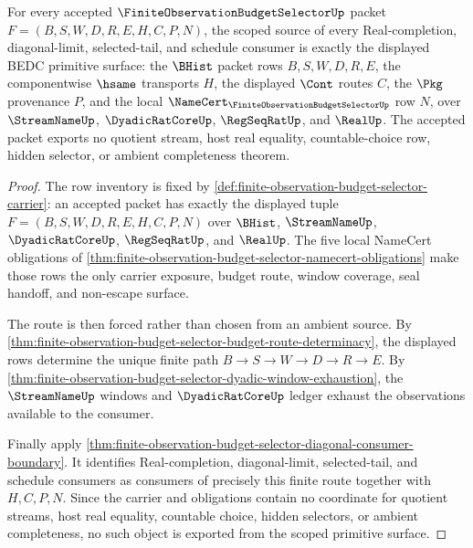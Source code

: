\begin{theorem}
\label{thm:finite-observation-budget-selector-primitive-scope}
For every accepted $\FiniteObservationBudgetSelectorUp$ packet $F=(B,S,W,D,R,E,H,C,P,N)$, the scoped source of every Real-completion, diagonal-limit, selected-tail, and schedule consumer is exactly the displayed BEDC primitive surface: the $\BHist$ packet rows $B,S,W,D,R,E$, the componentwise $\hsame$ transports $H$, the displayed $\Cont$ routes $C$, the $\Pkg$ provenance $P$, and the local $\NameCert_{\FiniteObservationBudgetSelectorUp}$ row $N$, over $\StreamNameUp$, $\DyadicRatCoreUp$, $\RegSeqRatUp$, and $\RealUp$. The accepted packet exports no quotient stream, host real equality, countable-choice row, hidden selector, or ambient completeness theorem.
\end{theorem}
\begin{proof}
The row inventory is fixed by \autoref{def:finite-observation-budget-selector-carrier}: an accepted packet has exactly the displayed tuple $F=(B,S,W,D,R,E,H,C,P,N)$ over $\BHist$, $\StreamNameUp$, $\DyadicRatCoreUp$, $\RegSeqRatUp$, and $\RealUp$. The five local NameCert obligations of \autoref{thm:finite-observation-budget-selector-namecert-obligations} make those rows the only carrier exposure, budget route, window coverage, seal handoff, and non-escape surface.

The route is then forced rather than chosen from an ambient source. By \autoref{thm:finite-observation-budget-selector-budget-route-determinacy}, the displayed rows determine the unique finite path $B \to S \to W \to D \to R \to E$. By \autoref{thm:finite-observation-budget-selector-dyadic-window-exhaustion}, the $\StreamNameUp$ windows and $\DyadicRatCoreUp$ ledger exhaust the observations available to the consumer.

Finally apply \autoref{thm:finite-observation-budget-selector-diagonal-consumer-boundary}. It identifies Real-completion, diagonal-limit, selected-tail, and schedule consumers as consumers of precisely this finite route together with $H,C,P,N$. Since the carrier and obligations contain no coordinate for quotient streams, host real equality, countable choice, hidden selectors, or ambient completeness, no such object is exported from the scoped primitive surface.
\end{proof}


